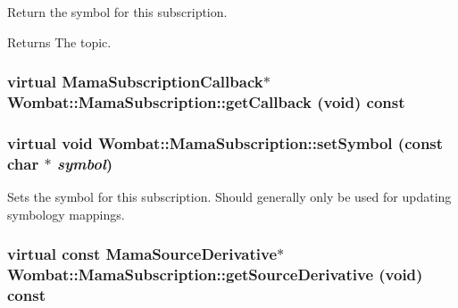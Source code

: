 Return the symbol for this subscription. \begin{DoxyReturn}{Returns}
The topic. 
\end{DoxyReturn}
\hypertarget{classWombat_1_1MamaSubscription_a32651a52180ffd292b27f2291559131a}{
\subsubsection[{getCallback}]{\setlength{\rightskip}{0pt plus 5cm}virtual {\bf MamaSubscriptionCallback}$\ast$ Wombat::MamaSubscription::getCallback (void) const}}
\label{classWombat_1_1MamaSubscription_a32651a52180ffd292b27f2291559131a}
\hypertarget{classWombat_1_1MamaSubscription_a189e15c14b75643e32e0e72b76d3bd14}{
\subsubsection[{setSymbol}]{\setlength{\rightskip}{0pt plus 5cm}virtual void Wombat::MamaSubscription::setSymbol (const char $\ast$ {\em symbol})}}
\label{classWombat_1_1MamaSubscription_a189e15c14b75643e32e0e72b76d3bd14}


Sets the symbol for this subscription. Should generally only be used for updating symbology mappings. \hypertarget{classWombat_1_1MamaSubscription_a4cca73373dc01f55978d85a13147f564}{
\subsubsection[{getSourceDerivative}]{\setlength{\rightskip}{0pt plus 5cm}virtual const {\bf MamaSourceDerivative}$\ast$ Wombat::MamaSubscription::getSourceDerivative (void) const}}
\label{classWombat_1_1MamaSubscription_a4cca73373dc01f55978d85a13147f564}



